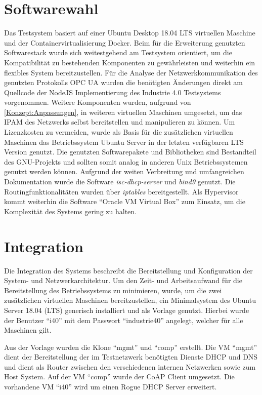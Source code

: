 \section{Softwarewahl}
Das Testsystem basiert auf einer Ubuntu Desktop 18.04 \ac{LTS} virtuellen Maschine und der Containervirtualisierung Docker. Beim für die Erweiterung genutzten Softwarestack wurde sich weitestgehend am Testsystem orientiert, um die Kompatibilität zu bestehenden Komponenten zu gewährleisten und weiterhin ein flexibles System bereitzustellen. Für die Analyse der Netzwerkkommunikation des genutzten Protokolls \ac{OPC UA} wurden die benötigten Änderungen direkt am Quellcode der NodeJS Implementierung des Industrie 4.0 Testsystems vorgenommen. Weitere Komponenten wurden, aufgrund von \autoref{Konzept:Anpassungen}, in weiteren virtuellen Maschinen umgesetzt, um das \ac{IPAM} des Netzwerks selbst bereitstellen und manipulieren zu können. Um Lizenzkosten zu vermeiden, wurde als Basis für die zusätzlichen virtuellen Maschinen das Betriebssystem Ubuntu Server in der letzten verfügbaren \ac{LTS} Version genutzt. Die genutzten Softwarepakete und Bibliotheken sind Bestandteil des GNU-Projekts und sollten somit analog in anderen Unix Betriebssystemen genutzt werden können. Aufgrund der weiten Verbreitung und umfangreichen Dokumentation wurde die Software \textit{isc-dhcp-server} und \textit{bind9} genutzt. Die Routingfunktionalitäten wurden über \textit{iptables} bereitgestellt. Als Hypervisor kommt weiterhin die Software "`Oracle VM Virtual Box"' zum Einsatz, um die Komplexität des Systems gering zu halten.

\section{Integration}
Die Integration des Systems beschreibt die Bereitstellung und Konfiguration der System- und Netzwerkarchitektur. Um den Zeit- und Arbeitsaufwand für die Bereitstellung des Betriebssystems zu minimieren, wurde, um die zwei zusätzlichen virtuellen Maschinen bereitzustellen, ein Minimalsystem des Ubuntu Server 18.04 (\ac{LTS}) generisch installiert und als Vorlage genutzt. Hierbei wurde der Benutzer "`i40"' mit dem Passwort "`industrie40"' angelegt, welcher für alle Maschinen gilt.

Aus der Vorlage wurden die Klone "`mgmt"' und "`comp"' erstellt. Die \ac{VM} "`mgmt"' dient der Bereitstellung der im Testnetzwerk benötigten Dienste \ac{DHCP} und \ac{DNS} und dient als Router zwischen den verschiedenen internen Netzwerken sowie zum Host System. Auf der \ac{VM} "`comp"' wurde der \ac{CoAP} Client umgesetzt. Die vorhandene \ac{VM} "`i40"' wird um einen Rogue DHCP Server erweitert. 

